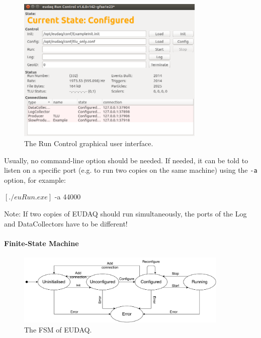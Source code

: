 \begin{figure}[htb]
  \begin{center}
    \includegraphics[width=0.8\textwidth]{src/images/RunControl}
    \caption{The Run Control graphical user interface.}
    \label{fig:RunControl}
  \end{center}
\end{figure}

Usually, no command-line option should be needed. 
If needed, it can be told to listen on a specific port (e.g. to run two copies on the same machine) 
using the \texttt{-a } option, for example:
\begin{listing}[mybash]
$[./euRun.exe]$ -a 44000
\end{listing}
Note: If two copies of EUDAQ should run simultaneously,
the ports of the Log and DataCollectors have to be different!

\paragraph{Finite-State Machine}
\label{sec:fsm}

\begin{figure}
\begin{center}
\includegraphics[width=0.9\textwidth]{src/images/fsmv2.pdf}
\end{center}
\caption{The FSM of EUDAQ.}
\label{fig:fsm}
\end{figure}

